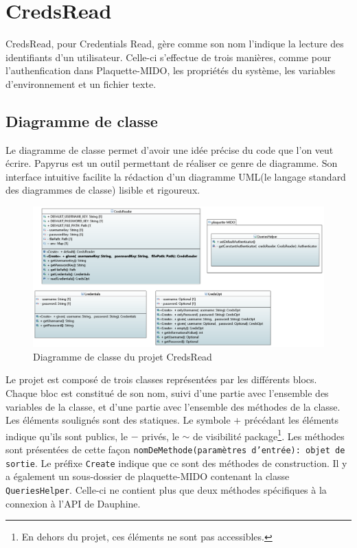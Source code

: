 \chapter[CredsRead]{CredsRead\raisebox{.3\baselineskip}{\normalsize\footnotemark}}

CredsRead, pour Credentials Read, gère comme son nom l'indique la lecture des identifiants d'un utilisateur. Celle-ci s'effectue de trois manières, comme pour l'authenfication dans Plaquette-MIDO, les propriétés du système, les variables d'environnement et un fichier texte.

\section{Diagramme de classe}
Le diagramme de classe permet d'avoir une idée précise du code que l'on veut écrire. Papyrus est un outil permettant de réaliser ce genre de diagramme. Son interface intuitive facilite la rédaction d'un diagramme UML(le langage standard des diagrammes de classe) lisible et rigoureux. 

\begin{figure}[!h]
    \begin{center}
    \includegraphics[width=\textwidth]{assets/doc.png}
    \end{center}
    \caption{Diagramme de classe du projet CredsRead}
\end{figure}


Le projet est composé de trois classes représentées par les différents blocs. Chaque bloc est constitué de son nom, suivi d'une partie avec l'ensemble des variables de la classe, et d'une partie avec l'ensemble des méthodes de la classe. Les éléments soulignés sont des statiques. Le symbole $+$ précédant les éléments indique qu'ils sont publics, le $-$ privés, le $\sim$ de visibilité package\footnote{En dehors du projet, ces éléments ne sont pas accessibles.}. Les méthodes sont présentées de cette façon \texttt{nomDeMethode(paramètres d'entrée): objet de sortie}. Le préfixe \texttt{Create} indique que ce sont des méthodes de construction. Il y a également un sous-dossier de plaquette-MIDO contenant la classe \texttt{QueriesHelper}. Celle-ci ne contient plus que deux méthodes spécifiques à la connexion à l'API de Dauphine.


